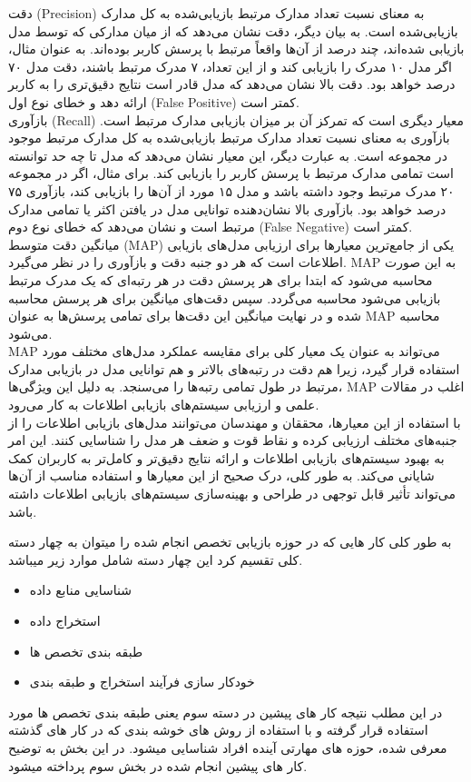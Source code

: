 دقت (Precision) به معنای نسبت تعداد مدارک مرتبط بازیابی‌شده به کل مدارک بازیابی‌شده است. به بیان دیگر، دقت نشان می‌دهد که از میان مدارکی که توسط مدل بازیابی شده‌اند، چند درصد از آن‌ها واقعاً مرتبط با پرسش کاربر بوده‌اند. به عنوان مثال، اگر مدل ۱۰ مدرک را بازیابی کند و از این تعداد، ۷ مدرک مرتبط باشند، دقت مدل ۷۰ درصد خواهد بود. دقت بالا نشان می‌دهد که مدل قادر است نتایج دقیق‌تری را به کاربر ارائه دهد و خطای نوع اول (False Positive) کمتر است.
\\
بازآوری (Recall) معیار دیگری است که تمرکز آن بر میزان بازیابی مدارک مرتبط است. بازآوری به معنای نسبت تعداد مدارک مرتبط بازیابی‌شده به کل مدارک مرتبط موجود در مجموعه است. به عبارت دیگر، این معیار نشان می‌دهد که مدل تا چه حد توانسته است تمامی مدارک مرتبط با پرسش کاربر را بازیابی کند. برای مثال، اگر در مجموعه ۲۰ مدرک مرتبط وجود داشته باشد و مدل ۱۵ مورد از آن‌ها را بازیابی کند، بازآوری ۷۵ درصد خواهد بود. بازآوری بالا نشان‌دهنده توانایی مدل در یافتن اکثر یا تمامی مدارک مرتبط است و نشان می‌دهد که خطای نوع دوم (False Negative) کمتر است.
\\
میانگین دقت متوسط (MAP) یکی از جامع‌ترین معیارها برای ارزیابی مدل‌های بازیابی اطلاعات است که هر دو جنبه دقت و بازآوری را در نظر می‌گیرد. MAP به این صورت محاسبه می‌شود که ابتدا برای هر پرسش دقت در هر رتبه‌ای که یک مدرک مرتبط بازیابی می‌شود محاسبه می‌گردد. سپس دقت‌های میانگین برای هر پرسش محاسبه شده و در نهایت میانگین این دقت‌ها برای تمامی پرسش‌ها به عنوان MAP محاسبه می‌شود.
\\
MAP می‌تواند به عنوان یک معیار کلی برای مقایسه عملکرد مدل‌های مختلف مورد استفاده قرار گیرد، زیرا هم دقت در رتبه‌های بالاتر و هم توانایی مدل در بازیابی مدارک مرتبط در طول تمامی رتبه‌ها را می‌سنجد. به دلیل این ویژگی‌ها، MAP اغلب در مقالات علمی و ارزیابی سیستم‌های بازیابی اطلاعات به کار می‌رود.
\\
با استفاده از این معیارها، محققان و مهندسان می‌توانند مدل‌های بازیابی اطلاعات را از جنبه‌های مختلف ارزیابی کرده و نقاط قوت و ضعف هر مدل را شناسایی کنند. این امر به بهبود سیستم‌های بازیابی اطلاعات و ارائه نتایج دقیق‌تر و کامل‌تر به کاربران کمک شایانی می‌کند. به طور کلی، درک صحیح از این معیارها و استفاده مناسب از آن‌ها می‌تواند تأثیر قابل توجهی در طراحی و بهینه‌سازی سیستم‌های بازیابی اطلاعات داشته باشد.


به طور کلی کار هایی که در حوزه بازیابی تخصص انجام شده را میتوان به چهار دسته کلی تقسیم کرد این چهار دسته شامل موارد زیر میباشد.
\begin{itemize}
	\item شناسایی منابع داده
	\item استخراج داده
	\item طبقه بندی تخصص ها
	\item خودکار سازی فرآیند استخراج و طبقه بندی
\end{itemize}
در این مطلب نتیجه کار های پیشین در دسته سوم یعنی طبقه بندی تخصص ها مورد استفاده قرار گرفته و با استفاده از روش های خوشه بندی که در کار های گذشته معرفی شده، حوزه های مهارتی آینده افراد شناسایی میشود.
در این بخش به توضیح کار های پیشین انجام شده در بخش سوم پرداخته میشود.
\cite{expret}



